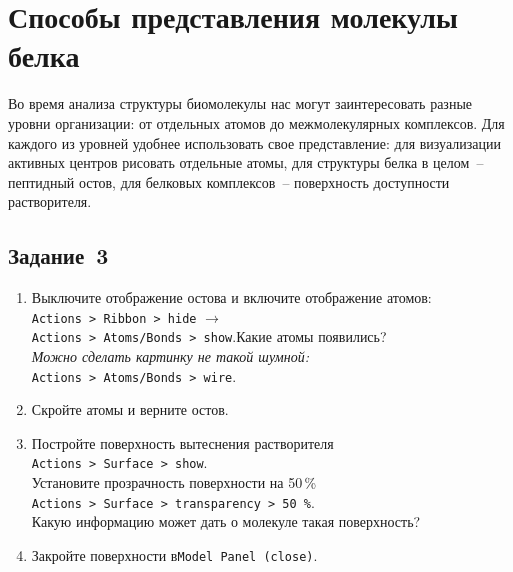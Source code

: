 \section{Способы представления молекулы белка}
Во время анализа структуры биомолекулы нас могут заинтересовать разные уровни
организации: от отдельных атомов до межмолекулярных комплексов. Для каждого из уровней удобнее использовать свое представление:
для визуализации активных центров рисовать отдельные атомы, для структуры белка в целом~-- пептидный остов, для белковых
комплексов~-- поверхность доступности растворителя.

\subsection*{Задание~3}
\begin{enumerate}
    \item Выключите отображение остова и включите отображение атомов:\\\quad\texttt{Actions~> Ribbon~> hide}\quad
    $\rightarrow$\\\quad\texttt{Actions~> Atoms/Bonds~> show}.\quad Какие атомы появились? \\
    \textit{Можно сделать картинку не такой шумной:}\\\quad\texttt{Actions~> Atoms/Bonds~> wire}.
    \item Скройте атомы и верните остов.
    \item \label{task:surf}{}Постройте поверхность вытеснения растворителя\\\quad\texttt{Actions~> Surface~> show}.\quad\\ Установите прозрачность поверхности на 50\,\%\\
    \quad\texttt{Actions~> Surface~> transparency~> 50\,\%}.\quad\\Какую информацию может дать о молекуле такая поверхность?
    \item Закройте поверхности в\quad\texttt{Model Panel (close)}.
\end{enumerate}